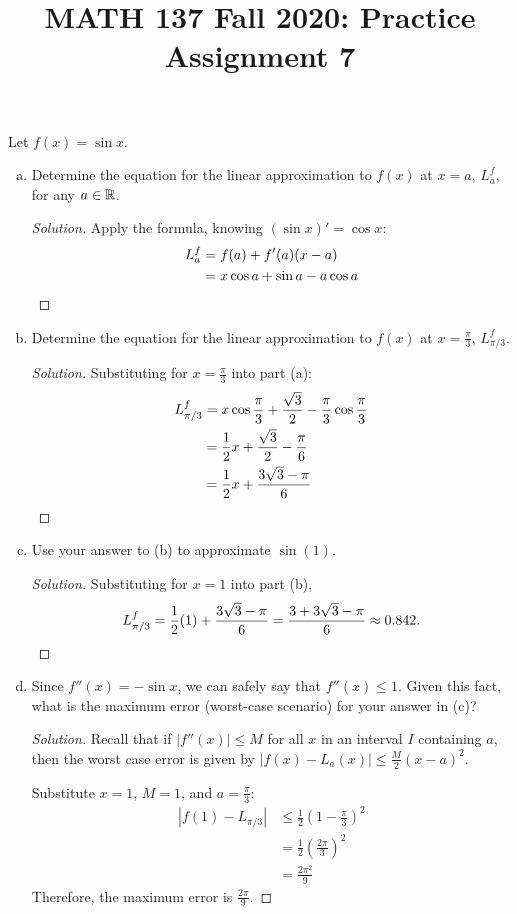 \documentclass{agony}
\title{MATH 137 Fall 2020: Practice Assignment 7}
\begin{document}
\thispagestyle{firstpage}

\textbf{\thetitle}

\question Let $f(x)=\sin x$.
\begin{enumerate}[(a)]
  \item Determine the equation for the linear approximation to $f(x)$ at $x=a$, $L^f_a$, for any $a\in\mathbb{R}$.
        \begin{proof}[Solution]
          Apply the formula, knowing $(\sin x)' = \cos x$:
          \begin{align*}
            L^f_a & = f(a)+f'(a)(x-a)                     \\
                  & = x\cos a + \sin a - a\cos a \qedhere
          \end{align*}
        \end{proof}
  \item Determine the equation for the linear approximation to $f(x)$ at $x=\frac\pi3$, $L^f_{\pi/3}$.
        \begin{proof}[Solution]
          Substituting for $x=\frac\pi3$ into part (a):
          \begin{align*}
            L^f_{\pi/3} & = x\cos\frac\pi3 + \frac{\sqrt3}{2} - \frac\pi3\cos\frac\pi3 \\
                        & = \frac12x + \frac{\sqrt3}{2} - \frac\pi6                    \\
                        & = \frac12x + \frac{3\sqrt3 - \pi}{6} \qedhere
          \end{align*}
        \end{proof}
  \item Use your answer to (b) to approximate $\sin(1)$.
        \begin{proof}[Solution]
          Substituting for $x=1$ into part (b),
          \[ L^f_{\pi/3}=\frac12(1) + \frac{3\sqrt3 - \pi}{6} =\dfrac{3+3\sqrt3-\pi}{6} \approx 0.842. \qedhere \]
        \end{proof}
  \item Since $f''(x)=-\sin x$, we can safely say that $f''(x) \leq 1$.
        Given this fact, what is the maximum error (worst-case scenario) for your answer in (c)?
        \begin{proof}[Solution]
          Recall that if $|f''(x)| \leq M$ for all $x$ in an interval $I$ containing $a$,
          then the worst case error is given by $|f(x)-L_a(x)| \leq \frac{M}{2}(x-a)^2$.

          Substitute $x=1$, $M=1$, and $a=\frac\pi3$:
          \begin{align*}
            |f(1)-L_{\pi/3}| & \leq \frac12\left(1-\frac\pi3\right)^2 \\
                             & = \frac12\left(\frac{2\pi}{3}\right)^2 \\
                             & = \frac{2\pi^2}{9}
          \end{align*}
          Therefore, the maximum error is $\frac{2\pi}{9}$.
        \end{proof}
\end{enumerate}
\end{document}
